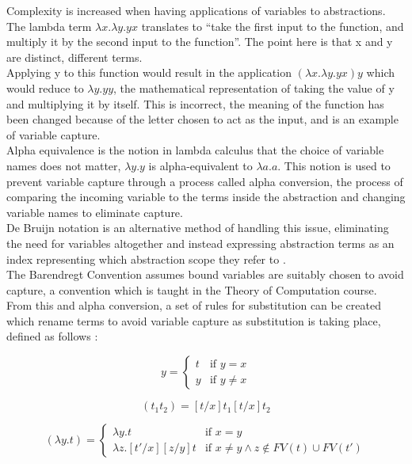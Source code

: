 \documentclass[a4paper,11pt]{report}
\begin{document}
Complexity is increased when having applications of variables to abstractions. The lambda term $\lambda x.\lambda y.yx$ translates to “take the first input to the function, and multiply it by the second input to the function”. The point here is that x and y are distinct, different terms.\\

Applying y to this function would result in the application $(\lambda x.\lambda y.yx)y$ which would reduce to $\lambda y.yy$, the mathematical representation of taking the value of y and multiplying it by itself. This is incorrect, the meaning of the function has been changed because of the letter chosen to act as the input, and is an example of variable capture.\\

Alpha equivalence is the notion in lambda calculus that the choice of variable names does not matter, $\lambda y.y$ is alpha-equivalent to $\lambda a.a$. This notion is used to prevent variable capture through a process called alpha conversion, the process of comparing the incoming variable to the terms inside the abstraction and changing variable names to eliminate capture.\\

De Bruijn notation is an alternative method of handling this issue, eliminating the need for variables altogether and instead expressing abstraction terms as an index representing which abstraction scope they refer to \cite{Kamareddine2000}.\\

The Barendregt Convention assumes bound variables are suitably chosen to avoid capture, a convention which is taught in the Theory of Computation course. From this and alpha conversion, a set of rules for substitution can be created which rename terms to avoid variable capture as substitution is taking place, defined as follows \cite{Acar2008}:

\begin{equation}
[t/x]y=\begin{cases}
t & \text{if $y=x$}\\
y & \text{if $y\ne x$}
\end{cases}
\end{equation}

\begin{equation}
[t/x](t_1t_2)=[t/x]t_1[t/x]t_2
\end{equation}

\begin{equation}
[t'/x](\lambda y.t)=\begin{cases}
\lambda y.t & \text{if $x=y$}\\
\lambda z.[t'/x][z/y]t & \text{if $x\ne y \land z\notin FV(t) \cup FV(t')$}
\end{cases}
\end{equation}
\end{document}
